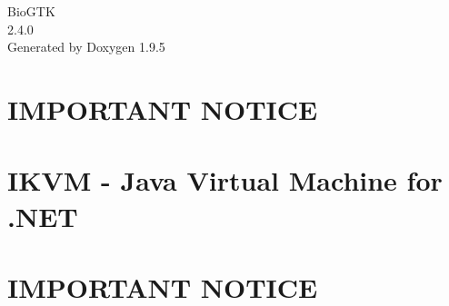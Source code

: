 \documentclass[twoside]{book}
\newcommand{\+}{\discretionary{\mbox{\scriptsize$\hookleftarrow$}}{}{}}
\newcommand{\clearemptydoublepage}{%
    \newpage{\pagestyle{empty}\cleardoublepage}%
  }
\begin{document}
  \raggedbottom
    \hypersetup{pageanchor=false,
                bookmarksnumbered=true,
                pdfencoding=unicode
               }
  \begin{titlepage}
  \vspace*{7cm}
  \begin{center}%
  {\Large Bio\+GTK}\\
  [1ex]\large 2.\+4.\+0 \\
  \vspace*{1cm}
  {\large Generated by Doxygen 1.9.5}\\
  \end{center}
  \end{titlepage}
  \clearemptydoublepage
  \tableofcontents
  \clearemptydoublepage
  \hypersetup{pageanchor=true}
\chapter{IMPORTANT NOTICE}
\label{md__f___shared__bio__bio_g_t_k__bio_g_t_k_bin__a_r_m64__release_net6_0_ikvm_linux_arm__l_i_c_e_n_s_e}

\chapter{IKVM -\/ Java Virtual Machine for .NET}
\label{md__f___shared__bio__bio_g_t_k__bio_g_t_k_bin__a_r_m64__release_net6_0_ikvm_linux_arm__r_e_a_d_m_e}

\chapter{IMPORTANT NOTICE}
\label{md__f___shared__bio__bio_g_t_k__bio_g_t_k_bin__a_r_m64__release_net6_0_ikvm_linux_arm64__l_i_c_e_n_s_e}

\end{document}
